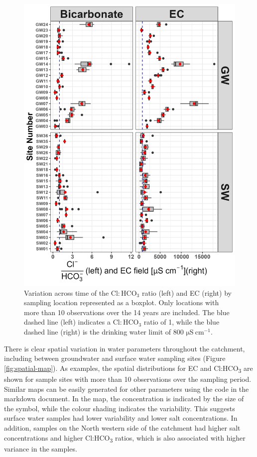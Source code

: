 \documentclass[, manuscript]{copernicus}
\begin{document}
\begin{figure}
\includegraphics[width=0.7\linewidth]{Figures/boxplots} \caption{Variation across time of the $\mathrm{Cl:HCO_3}$ ratio (left) and EC (right) by sampling location represented as a boxplot. Only locations with more than 10 observations over the 14 years are included. The blue dashed line (left) indicates a $\mathrm{Cl:HCO_3}$ ratio of 1, while the blue dashed line (right) is the drinking water limit of 800 $\mathrm{\mu S~cm^{-1}}$.}\label{fig:boxplots}
\end{figure}

There is clear spatial variation in water parameters throughout the
catchment, including between groundwater and surface water sampling
sites (Figure \ref{fig:spatial-map}). As examples, the spatial
distributions for EC and Cl:HCO\textsubscript{3} are shown for sample
sites with more than 10 observations over the sampling period. Similar
maps can be easily generated for other parameters using the code in the
markdown document. In the map, the concentration is indicated by the
size of the symbol, while the colour shading indicates the variability.
This suggests surface water samples had lower variability and lower salt
concentrations. In addition, samples on the North western side of the
catchment had higher salt concentrations and higher
Cl:HCO\textsubscript{3} ratios, which is also associated with higher
variance in the samples.
\end{document}
